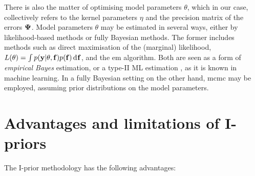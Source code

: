 \documentclass[11pt,twoside,openright,showframe]{report}
\begin{document}
There is also the matter of optimising model parameters $\theta$, which in our case, collectively refers to the kernel parameters $\eta$ and the precision matrix of the errors ${\bm\Psi}$.
Model parameters $\theta$ may be estimated in several ways, either by likelihood-based methods or fully Bayesian methods.
The former includes methods such as direct maximisation of the (marginal) likelihood, $L(\theta) = \int p({\mathbf y}|\theta,{\mathbf f})p({\mathbf f})\operatorname{d}\hspace{0.5pt}\! {\mathbf f}$, and the \gls*{em} algorithm.
Both are seen as a form of \emph{empirical Bayes} estimation, or a type-II ML estimation \citep{bishop2006pattern}, as it is known in machine learning.
In a fully Bayesian setting on the other hand, \gls*{mcmc} may be employed, assuming prior distributions on the model parameters.

\section{Advantages and limitations of I-priors}

The I-prior methodology has the following advantages:
\end{document}
